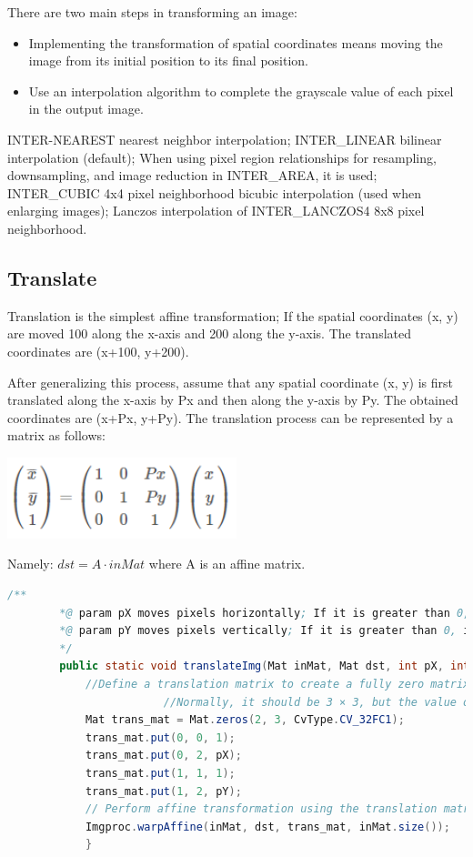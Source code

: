 \documentclass{article}
\begin{document}
	There are two main steps in transforming an image:
	\begin{itemize}
		\item Implementing the transformation of spatial coordinates means moving the image from its initial position to its final position.
		\item Use an interpolation algorithm to complete the grayscale value of each pixel in the output image.
	\end{itemize}
	INTER-NEAREST nearest neighbor interpolation;
	INTER\_LINEAR bilinear interpolation (default);
	When using pixel region relationships for resampling, downsampling, and image reduction in INTER\_AREA, it is used;
	INTER\_CUBIC 4x4 pixel neighborhood bicubic interpolation (used when enlarging images);
	Lanczos interpolation of INTER\_LANCZOS4 8x8 pixel neighborhood.
	
	\subsection{Translate}
	Translation is the simplest affine transformation; If the spatial coordinates (x, y) are moved 100 along the x-axis and 200 along the y-axis. The translated coordinates are (x+100, y+200).
	
	After generalizing this process, assume that any spatial coordinate (x, y) is first translated along the x-axis by Px and then along the y-axis by Py. The obtained coordinates are (x+Px, y+Py). The translation process can be represented by a matrix as follows:
	
	\begin{center}
		\includegraphics[width=0.5\textwidth]{mdpic/20240918163045.png}
	\end{center}
	
	Namely: \( dst=A \cdot inMat \) where A is an affine matrix.
	\begin{lstlisting}[language=Java]
		/**
		*@ param pX moves pixels horizontally; If it is greater than 0, it indicates positive movement along the axis; if it is less than 0, it indicates negative movement along the axis
		*@ param pY moves pixels vertically; If it is greater than 0, it indicates positive movement along the axis; if it is less than 0, it indicates negative movement along the axis
		*/
		public static void translateImg(Mat inMat, Mat dst, int pX, int pY) {
			//Define a translation matrix to create a fully zero matrix with 2 rows and 3 columns;
						//Normally, it should be 3 × 3, but the value of the last line has been fixed to 0 0 1
			Mat trans_mat = Mat.zeros(2, 3, CvType.CV_32FC1);
			trans_mat.put(0, 0, 1);
			trans_mat.put(0, 2, pX);
			trans_mat.put(1, 1, 1);
			trans_mat.put(1, 2, pY);
			// Perform affine transformation using the translation matrix
			Imgproc.warpAffine(inMat, dst, trans_mat, inMat.size());
			}
		\end{lstlisting}
	
\end{document}
